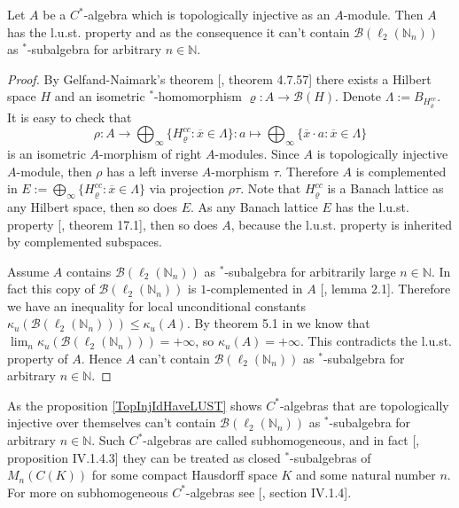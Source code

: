 \begin{proposition}\label{TopInjIdHaveLUST} Let $A$ be a $C^*$-algebra which is topologically injective as an $A$-module. Then $A$ has the l.u.st. property and as the consequence it can't contain  $\mathcal{B}(\ell_2(\mathbb{N}_n))$ as ${}^*$-subalgebra for arbitrary $n\in\mathbb{N}$.
\end{proposition}
\begin{proof} By Gelfand-Naimark's theorem [\cite{HelBanLocConvAlg}, theorem 4.7.57] there exists a Hilbert space $H$ and an isometric ${}^*$-homomorphism $\varrho:A\to\mathcal{B}(H)$. Denote $\Lambda:=B_{H_\varrho^{cc}}$. It is easy to check that 
$$
\rho:A\to\bigoplus\nolimits_\infty\{H_\varrho^{cc}:\overline{x}\in \Lambda\}:a\mapsto \bigoplus\nolimits_\infty\{\overline{x}\cdot a:\overline{x}\in \Lambda\}
$$
is an isometric $A$-morphism of right $A$-modules. Since $A$ is topologically injective $A$-module, then $\rho$ has a left inverse $A$-morphism $\tau$. Therefore $A$ is complemented in $E:=\bigoplus_\infty\{H_\varrho^{cc}:\overline{x}\in \Lambda\}$ via projection $\rho\tau$. Note that $H_{\varrho}^{cc}$ is a Banach lattice as any Hilbert space, then so does $E$. As any Banach lattice $E$ has the l.u.st. property [\cite{DiestAbsSumOps}, theorem 17.1], then so does $A$, because the l.u.st. property is inherited by complemented subspaces.

Assume $A$ contains $\mathcal{B}(\ell_2(\mathbb{N}_n))$ as ${}^*$-subalgebra for arbitrarily large $n\in\mathbb{N}$. In fact this copy of $\mathcal{B}(\ell_2(\mathbb{N}_n))$ is $1$-complemented in $A$ [\cite{LauLoyWillisAmnblOfBanAndCStarAlgsOfLCG}, lemma 2.1]. Therefore we have an inequality for local unconditional constants $\kappa_u(\mathcal{B}(\ell_2(\mathbb{N}_n)))\leq \kappa_u(A)$. By theorem 5.1 in \cite{GorLewAbsSmOpAndLocUncondStrct} we know that $\lim_n \kappa_u(\mathcal{B}(\ell_2(\mathbb{N}_n)))=+\infty$, so $\kappa_u(A)=+\infty$. This contradicts the l.u.st. property of $A$. Hence $A$ can't contain $\mathcal{B}(\ell_2(\mathbb{N}_n))$ as ${}^*$-subalgebra for arbitrary $n\in\mathbb{N}$.
\end{proof}

As the proposition \ref{TopInjIdHaveLUST} shows $C^*$-algebras that are topologically injective over themselves can't contain $\mathcal{B}(\ell_2(\mathbb{N}_n))$ as ${}^*$-subalgebra for arbitrary $n\in\mathbb{N}$. Such $C^*$-algebras are called subhomogeneous, and in fact [\cite{BlackadarOpAlg}, proposition IV.1.4.3] they can be treated as closed ${}^*$-subalgebras of $M_n(C(K))$ for some compact Hausdorff space $K$ and some natural number $n$. For more on subhomogeneous $C^*$-algebras see [\cite{BlackadarOpAlg}, section IV.1.4]. 

